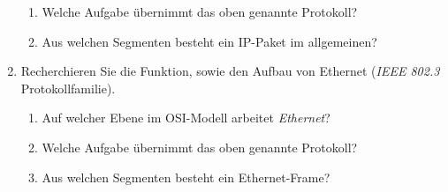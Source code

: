 \documentclass[paper=a4,fontsize=11pt]{scrartcl}%
\numberwithin{equation}{section}
\begin{document}
\begin{enumerate}
\begin{enumerate}
		\item Welche Aufgabe übernimmt das oben genannte Protokoll?
		\item Aus welchen Segmenten besteht ein IP-Paket im allgemeinen?
	\end{enumerate}
	\item Recherchieren Sie die Funktion, sowie den Aufbau von Ethernet (\emph{IEEE 802.3} Protokollfamilie).
	\begin{enumerate}
		\item Auf welcher Ebene im OSI-Modell arbeitet \emph{Ethernet}?
		\item Welche Aufgabe übernimmt das oben genannte Protokoll?
		\item Aus welchen Segmenten besteht ein Ethernet-Frame?
	\end{enumerate}	
\end{enumerate}
\end{document}
